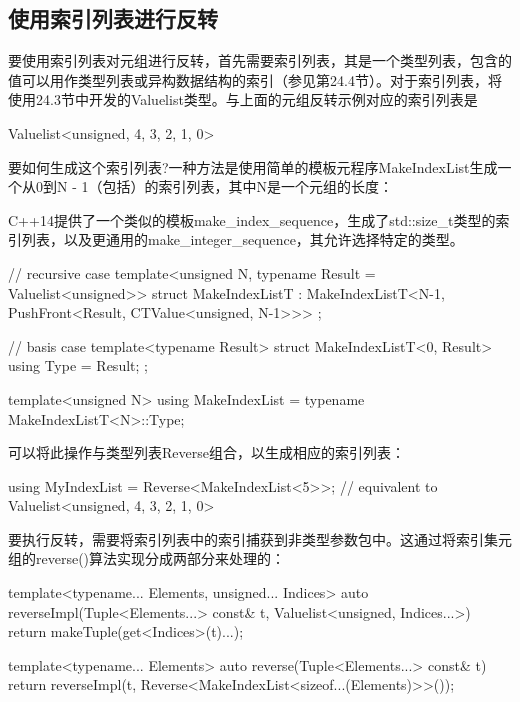 \subsection{使用索引列表进行反转}

要使用索引列表对元组进行反转，首先需要索引列表，其是一个类型列表，包含的值可以用作类型列表或异构数据结构的索引（参见第24.4节）。对于索引列表，将使用24.3节中开发的Valuelist类型。与上面的元组反转示例对应的索引列表是

\begin{cpp}
Valuelist<unsigned, 4, 3, 2, 1, 0>
\end{cpp}

要如何生成这个索引列表?一种方法是使用简单的模板元程序MakeIndexList生成一个从0到N - 1（包括）的索引列表，其中N是一个元组的长度：

\begin{notice}
C++14提供了一个类似的模板make\_index\_sequence，生成了std::size\_t类型的索引列表，以及更通用的make\_integer\_sequence，其允许选择特定的类型。
\end{notice}

\begin{cpp}
// recursive case
template<unsigned N, typename Result = Valuelist<unsigned>>
struct MakeIndexListT
: MakeIndexListT<N-1, PushFront<Result, CTValue<unsigned, N-1>>>
{
};

// basis case
template<typename Result>
struct MakeIndexListT<0, Result>
{
	using Type = Result;
};

template<unsigned N>
using MakeIndexList = typename MakeIndexListT<N>::Type;
\end{cpp}

可以将此操作与类型列表Reverse组合，以生成相应的索引列表：

\begin{cpp}
using MyIndexList = Reverse<MakeIndexList<5>>;
					// equivalent to Valuelist<unsigned, 4, 3, 2, 1, 0>
\end{cpp}

要执行反转，需要将索引列表中的索引捕获到非类型参数包中。这通过将索引集元组的reverse()算法实现分成两部分来处理的：

\begin{cpp}
template<typename... Elements, unsigned... Indices>
auto reverseImpl(Tuple<Elements...> const& t,
Valuelist<unsigned, Indices...>)
{
	return makeTuple(get<Indices>(t)...);
}

template<typename... Elements>
auto reverse(Tuple<Elements...> const& t)
{
	return reverseImpl(t,
	Reverse<MakeIndexList<sizeof...(Elements)>>());
}
\end{cpp}

